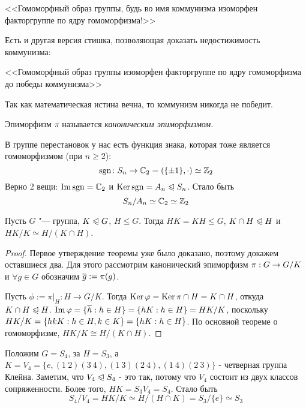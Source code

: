 \begin{note}
	<<Гомоморфный образ группы, будь во имя коммунизма изоморфен факторгруппе по ядру гомоморфизма!>>
\end{note}

\begin{note}
	Есть и другая версия стишка, позволяющая доказать недостижимость коммунизма:
	
	<<Гомоморфный образ группы изоморфен факторгруппе по ядру гомоморфизма до победы коммунизма>>
	
	Так как математическая истина вечна, то коммунизм никогда не победит.
\end{note}

\begin{note}
	Эпиморфизм $\pi$ называется \textit{каноническим эпиморфизмом}.
\end{note}

\begin{example}
	В группе перестановок у нас есть функция знака, которая тоже является гомоморфизмом (при $n \ge 2$):
	\[
		\operatorname{\mathop{sgn}} \colon S_n \to \mathbb{C}_2 = (\{\pm 1\}, \cdot) \simeq \mathbb{Z}_2
	\]
	Верно 2 вещи: $\operatorname{Im} \operatorname{\mathop{sgn}} = \mathbb{C}_2$ и $\operatorname{Ker} \operatorname{\mathop{sgn}} = A_n \trianglelefteqslant S_n$. Стало быть
	\[
		S_n / A_n \simeq \mathbb{C}_2 \simeq \mathbb{Z}_2
	\]
\end{example}

\begin{theorem}
	Пусть $G$ "--- группа, $K \trianglelefteqslant G$, $H \le G$. Тогда $HK = KH \le G$, $K \cap H \trianglelefteqslant H$ и $HK / K \simeq H / (K \cap H)$.
\end{theorem}

\begin{proof}
	Первое утверждение теоремы уже было доказано, поэтому докажем оставшиеся два. Для этого рассмотрим канонический эпиморфизм $\pi: G \hm\to G / K$ и $\forall g \in G$ обозначим $\overline{g} := \pi(g)$.
	
	Пусть $\phi := \pi|_H : H \to G/ K$. Тогда $\operatorname{Ker} \varphi = \operatorname{Ker}\pi \cap H = K \cap H$, откуда $K \cap H \trianglelefteqslant H$. $\im \phi = \{\ol{h}: h \in H\} = \{hK: h \hm\in H\} = HK / K$, поскольку $HK / K \hm= \{hkK: h \in H, k \hm\in K\} = \{hK: h \in H\}$. По основной теореме о гомоморфизме, $HK / K \cong H / (K \cap H)$.
\end{proof}

\begin{example}
	Положим $G = S_4$, за $H = S_3$, а $K = V_4 = \{e, (1\ 2)(3\ 4), (1\ 3)(2\ 4), (1\ 4)(2\ 3)\}$ - четверная группа Клейна. Заметим, что $V_4 \trianglelefteqslant S_4$ - это так, потому что $V_4$ состоит из двух классов сопряженности. Более того, $HK = S_3 V_4 = S_4$. Стало быть
	\[
		S_4 / V_4 = HK / K \simeq H / (H \cap K) = S_3 / \{e\} \simeq S_3
	\]
\end{example}

